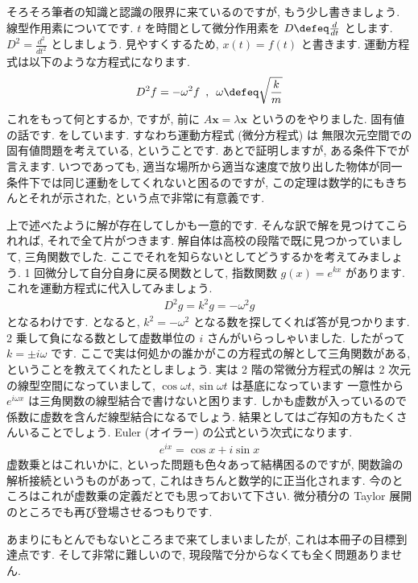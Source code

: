 \documentclass[openany, a4paper, oneside]{jsbook}
\begin{document}
そろそろ筆者の知識と認識の限界に来ているのですが, もう少し書きましょう.
線型作用素についてです.  $t$ を時間として微分作用素を $D\defeq\frac{d}{dt}$ とします.
 $D^2=\frac{d^2}{dt^2}$ としましょう.
見やすくするため,  $x (t) = f (t)$ と書きます. 運動方程式は以下のような方程式になります.
\begin{align}
    D^2f = -\omega ^{2} f \,\,\, , \,\,\, \omega \defeq \sqrt{\frac{k}{m}}
\end{align}
これをもって何とするか, ですが, 前に $A\bm{x}=\lambda \bm{x}$ というのをやりました.
固有値の話です. をしています. すなわち運動方程式 (微分方程式) は
無限次元空間での固有値問題を考えている, ということです.
あとで証明しますが, ある条件下でが言えます.
いつであっても, 適当な場所から適当な速度で放り出した物体が同一条件下では同じ運動をしてくれないと困るのですが,
この定理は数学的にもきちんとそれが示された, という点で非常に有意義です.

上で述べたように解が存在してしかも一意的です. そんな訳で解を見つけてこられれば, それで全て片がつきます.
解自体は高校の段階で既に見つかっていまして, 三角関数でした. ここでそれを知らないとしてどうするかを考えてみましょう.
1 回微分して自分自身に戻る関数として, 指数関数 $g (x)=e^{kx}$ があります. これを運動方程式に代入してみましょう.
\begin{align}
    D^2 g = k^2 g = - \omega ^{2} g
\end{align}
となるわけです. となると,  $k^2=-\omega^2$ となる数を探してくれば答が見つかります.
2 乗して負になる数として虚数単位の $i$ さんがいらっしゃいました. したがって $k=\pm i\omega$ です.
ここで実は何処かの誰かがこの方程式の解として三角関数がある, ということを教えてくれたとしましょう.
実は 2 階の常微分方程式の解は 2 次元の線型空間になっていまして,  $\cos \omega t,\sin \omega t$ は基底になっています
一意性から $e^{i\omega x}$ は三角関数の線型結合で書けないと困ります. しかも虚数が入っているので
係数に虚数を含んだ線型結合になるでしょう. 結果としてはご存知の方もたくさんいることでしょう.
Euler (オイラー) の公式という次式になります.
\begin{align}
    e^{ix} = \cos x + i \sin x
\end{align}
虚数乗とはこれいかに, といった問題も色々あって結構困るのですが,
関数論の解析接続というものがあって, これはきちんと数学的に正当化されます.
今のところはこれが虚数乗の定義だとでも思っておいて下さい.
微分積分の Taylor 展開のところでも再び登場させるつもりです.

あまりにもとんでもないところまで来てしまいましたが, これは本冊子の目標到達点です.
そして非常に難しいので, 現段階で分からなくても全く問題ありません.
\end{document}
